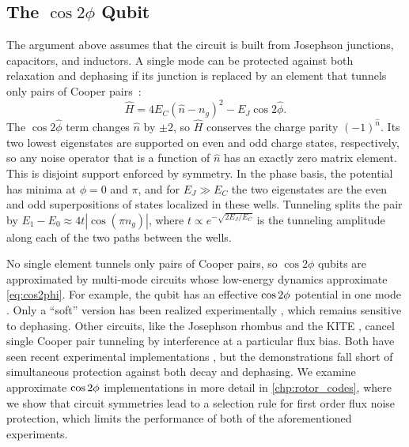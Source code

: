 \subsection{The \texorpdfstring{$\cos 2\phi$}{cos 2φ} Qubit}
\label{sec:cos2phi}

The argument above assumes that the circuit is built from Josephson junctions, capacitors, and inductors.
A single mode can be protected against both relaxation and dephasing if its junction is replaced by an element that tunnels only pairs of Cooper pairs~\cite{gyenisMovingTransmonNoiseProtected2021b,smithSuperconductingCircuitProtected2020b}:
\begin{equation}
	\hat H
	=
	4 E_C \left(\hat n - n_g\right)^2
	-
	E_J \cos 2\hat\phi
	.
	\label{eq:cos2phi}
\end{equation}
The $\cos 2\hat\phi$ term changes $\hat n$ by $\pm 2$, so $\hat H$ conserves the charge parity $(-1)^{\hat n}$.
Its two lowest eigenstates are supported on even and odd charge states, respectively, so any noise operator that is a function of $\hat n$ has an exactly zero matrix element.
This is disjoint support enforced by symmetry.
In the phase basis, the potential has minima at $\phi = 0$ and $\pi$, and for $E_J \gg E_C$ the two eigenstates are the even and odd superpositions of states localized in these wells.
Tunneling splits the pair by $E_1 - E_0 \approx 4t|\cos(\pi n_g)|$, where $t \propto e^{-\sqrt{2E_J/E_C}}$ is the tunneling amplitude along each of the two paths between the wells.

No single element tunnels only pairs of Cooper pairs, so $\cos 2\phi$ qubits are approximated by multi-mode circuits whose low-energy dynamics approximate \cref{eq:cos2phi}.
For example, the \zps qubit has an effective $\cos 2\phi$ potential in one mode \cite{brooks2013,Dempster2014understanding,groszkowski2018,paolo_control_2019}. Only a ``soft'' version has been realized experimentally \cite{Gyenis_zero_pi_2021a}, which remains sensitive to dephasing.
Other circuits, like the Josephson rhombus \cite{Bell2014} and the KITE \cite{smithSuperconductingCircuitProtected2020b}, cancel single Cooper pair tunneling by interference at a particular flux bias.
Both have seen recent experimental implementations \cite{sanchezRevisitingMultimodeRhombus2026a, Roverch2026experimental}, but the demonstrations fall short of simultaneous protection against both decay and dephasing. 
We examine approximate $\cos 2\phi$ implementations in more detail in \cref{chp:rotor_codes}, where we show that circuit symmetries lead to a selection rule for first order flux noise protection, which limits the performance of both of the aforementioned experiments.


